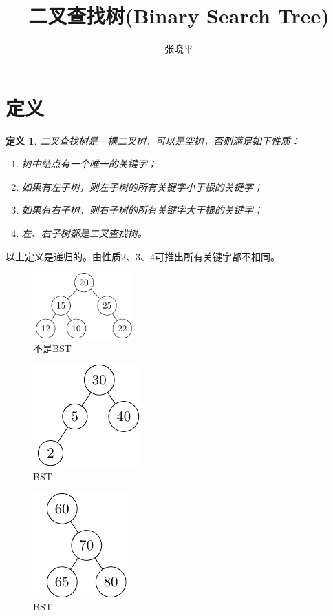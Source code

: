 \documentclass[10pt]{article}
\begin{document}
\renewcommand{\proofname}{\textbf{证明}}
\newtheorem{li}{例}
\newtheorem{jielun}{结论}
\newtheorem{dingli}{定理}
\newtheorem{mingti}{{命题}} 
\newtheorem{yinli}{{引理}} 
\newtheorem{tuilun}{{推论}}
\newtheorem{dingyi}{{定义}} 
\newtheorem*{jie}{{解}}
\newtheorem*{zhengming}{{证明}}
\newtheorem{zhu}{{注}}
\newtheorem*{zhu*}{{注}}
\newtheorem{xingzhi}{{性质}}
\newtheorem{wenti}{{问题}}
\newtheorem{xiti}{{习题}}

\title{二叉查找树(Binary Search Tree)}
\author{张晓平}
\maketitle

\section{定义}
\begin{dingyi}
二叉查找树是一棵二叉树，可以是空树，否则满足如下性质：
\begin{enumerate}
\item 树中结点有一个唯一的关键字；
\item 如果有左子树，则左子树的所有关键字小于根的关键字；
\item 如果有右子树，则右子树的所有关键字大于根的关键字；
\item 左、右子树都是二叉查找树。
\end{enumerate}
\end{dingyi}
以上定义是递归的。由性质2、3、4可推出所有关键字都不相同。
\begin{figure}[htbp]
\centering
\includegraphics[width=1.5in]{TIKZ/bst/bst1.pdf}  
\caption{不是BST}
\end{figure}
\begin{figure}[htbp]
\centering
\includegraphics[width=1.in]{TIKZ/bst/bst2.pdf}
\caption{BST}  
\end{figure}
\begin{figure}[htbp]
\centering
\includegraphics[width=.9in]{TIKZ/bst/bst3.pdf}  
\caption{BST}
\end{figure}
 
\end{document}
